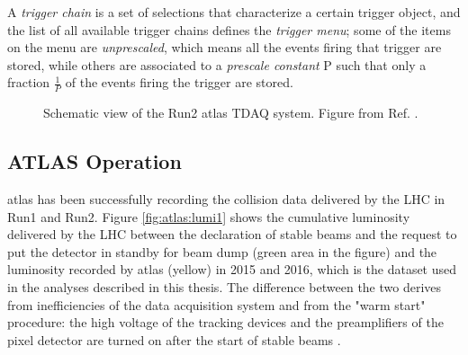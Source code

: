A \textit{trigger chain} is a set of selections that characterize a certain trigger object, and the list of all available trigger chains defines the \textit{trigger menu}; some of the items on the menu are \textit{unprescaled}, which means all the events firing that trigger are stored, while others are associated to a \textit{prescale constant} P such that only a fraction $\frac{1}{P}$ of the events firing the trigger are stored.

\begin{figure}[ht]
\centering
{}
\caption{Schematic view of the Run2 \gls{atlas} TDAQ system. Figure from Ref. \cite{Aaboud:2016leb}.}
\label{fig:atlas:trig}
\end{figure}


\subsection{ATLAS Operation}

\gls{atlas} has been successfully recording the collision data delivered by the LHC in Run1 and Run2. Figure \ref{fig:atlas:lumi1} shows the cumulative luminosity delivered by the LHC between the declaration of stable beams and the request to put the detector in standby for beam dump (green area in the figure) and the luminosity recorded by \gls{atlas} (yellow) in 2015 and 2016, which is the dataset used in the analyses described in this thesis. The difference between the two derives from inefficiencies of the data acquisition system and from the "warm start" procedure: the high voltage of the tracking devices and the preamplifiers of the pixel detector are turned on after the start of stable beams \cite{LumiTwiki}.

